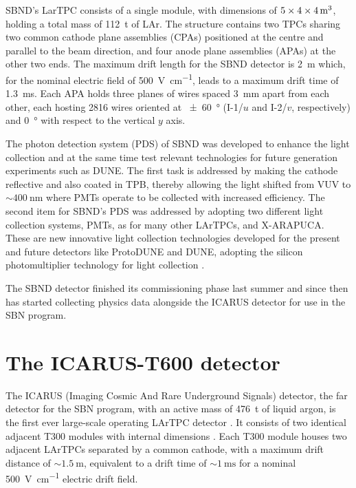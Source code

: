 SBND's LarTPC consists of a single module, with dimensions of $\qtyproduct[product-units = power]{5x4x4}{\meter}$, holding a total mass of \SI{112}{\tonne} of LAr. The structure contains two TPCs sharing two common cathode plane assemblies (CPAs) positioned at the centre and parallel to the beam direction, and four anode plane assemblies (APAs) at the other two ends. The maximum drift length for the SBND detector is \SI{2}{\meter} which, for the nominal electric field of \SI{500}{\volt\per\cm}, leads to a maximum drift time of \SI{1.3}{\ms}. Each APA holds three planes of wires spaced \SI{3}{\mm} apart from each other, each hosting \num{2816} wires oriented at \SI{+-60}{\degree} (I-1/$u$ and I-2/$v$, respectively) and \SI{0}{\degree} with respect to the vertical $y$ axis. 

The photon detection system (PDS) of SBND was developed to enhance the light collection and at the same time test relevant technologies for future generation experiments such as DUNE. The first task is addressed by making the cathode reflective and also coated in TPB, thereby allowing the light shifted from VUV to ${\sim}\SI{400}{\nm}$ where PMTs operate to be collected with increased efficiency. The second item for SBND's PDS was addressed by adopting two different light collection systems, PMTs, as for many other LArTPCs, and X-ARAPUCA. These are new innovative light collection technologies developed for the present and future detectors like ProtoDUNE and DUNE, adopting the silicon photomultiplier technology for light collection \cite{Bonivento:2024qpn}. 

The SBND detector finished its commissioning phase last summer and since then has started collecting physics data alongside the ICARUS detector for use in the SBN program. 

\section{The ICARUS-T600 detector}  \label{sec:ICARUS_T600}

The ICARUS (Imaging Cosmic And Rare Underground Signals) detector, the far detector for the SBN program, with an active mass of \SI{476}{\tonne} of liquid argon, is the first ever large-scale operating LArTPC detector \cite{amerioDesignConstructionTests2004c}. It consists of two identical adjacent T300 modules with internal dimensions . Each T300 module houses two adjacent LArTPCs separated by a common cathode, with a maximum drift distance of ${\sim}\SI{1.5}{\m}$, equivalent to a drift time of ${\sim}\SI{1}{\ms}$ for a nominal \SI{500}{\volt\per\cm} electric drift field.

